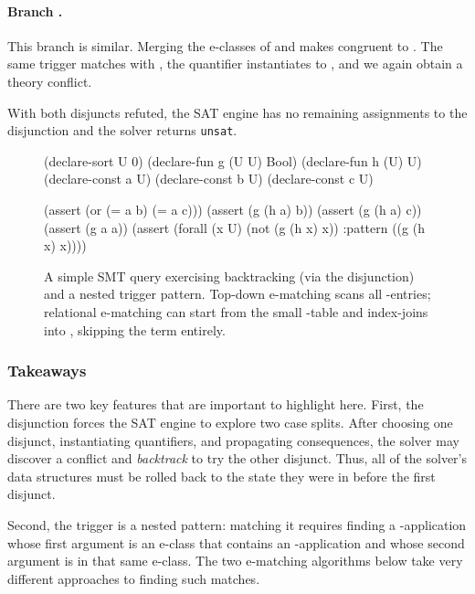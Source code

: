 \paragraph{Branch .} This branch is similar. Merging the e-classes
of  and  makes  congruent to .
The same trigger  matches with , the quantifier
instantiates to , and we again obtain a theory conflict.

With both disjuncts refuted, the SAT engine has no remaining assignments to the
disjunction and the solver returns \texttt{unsat}. 


\begin{figure}
\begin{smtlib}
(declare-sort U 0) 
(declare-fun g (U U) Bool) 
(declare-fun h (U) U)
(declare-const a U) 
(declare-const b U) 
(declare-const c U)

(assert (or (= a b) (= a c)))
(assert (g (h a) b)) 
(assert (g (h a) c)) 
(assert (g a a))
(assert (forall (x U) (not (g (h x) x)) 
          :pattern ((g (h x) x))))
\end{smtlib}
\caption{A simple SMT query exercising backtracking (via the disjunction) and a
nested trigger pattern. Top-down e-matching scans all -entries;
relational e-matching can start  from the small -table and index-joins into
, skipping the   term entirely.}
\label{fig:running-example}
\end{figure}

\subsubsection{Takeaways}
There are two key features that are important to highlight here. First, the disjunction
forces the SAT engine to explore two case splits. After choosing one disjunct,
instantiating quantifiers, and propagating consequences, the solver may discover
a conflict and \emph{backtrack} to try the other disjunct. Thus, all of the
solver's data structures must be rolled back to the state they were in before the first
disjunct.

Second, the trigger  is a nested pattern: matching it requires finding a -application
whose first argument is an e-class that contains an -application and
whose second argument is in that same e-class. The two e-matching algorithms
below take very different approaches to finding such matches.

